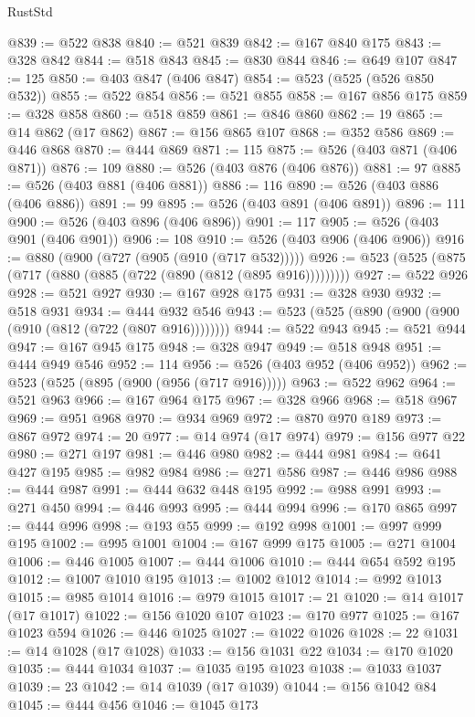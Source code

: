 \begin{lexlean}{RustStd}
\begin{coremodule}
{\begin{coremodule}
{{{{{{{{{{{{{{{{{{{{{{{{{{{{{{{{{{@839 := @522 @838
@840 := @521 @839
@842 := @167 @840 @175
@843 := @328 @842
@844 := @518 @843
@845 := @830 @844
@846 := @649 @107
@847 := 125
@850 := @403 @847 (@406 @847)
@854 := @523 (@525 (@526 @850 @532))
@855 := @522 @854
@856 := @521 @855
@858 := @167 @856 @175
@859 := @328 @858
@860 := @518 @859
@861 := @846 @860
@862 := 19
@865 := @14 @862 (@17 @862)
@867 := @156 @865 @107
@868 := @352 @586
@869 := @446 @868
@870 := @444 @869
@871 := 115
@875 := @526 (@403 @871 (@406 @871))
@876 := 109
@880 := @526 (@403 @876 (@406 @876))
@881 := 97
@885 := @526 (@403 @881 (@406 @881))
@886 := 116
@890 := @526 (@403 @886 (@406 @886))
@891 := 99
@895 := @526 (@403 @891 (@406 @891))
@896 := 111
@900 := @526 (@403 @896 (@406 @896))
@901 := 117
@905 := @526 (@403 @901 (@406 @901))
@906 := 108
@910 := @526 (@403 @906 (@406 @906))
@916 := @880 (@900 (@727 (@905 (@910 (@717 @532)))))
@926 := @523 (@525 (@875 (@717 (@880 (@885 (@722 (@890 (@812 (@895 @916)))))))))
@927 := @522 @926
@928 := @521 @927
@930 := @167 @928 @175
@931 := @328 @930
@932 := @518 @931
@934 := @444 @932 @546
@943 := @523 (@525 (@890 (@900 (@900 (@910 (@812 (@722 (@807 @916))))))))
@944 := @522 @943
@945 := @521 @944
@947 := @167 @945 @175
@948 := @328 @947
@949 := @518 @948
@951 := @444 @949 @546
@952 := 114
@956 := @526 (@403 @952 (@406 @952))
@962 := @523 (@525 (@895 (@900 (@956 (@717 @916)))))
@963 := @522 @962
@964 := @521 @963
@966 := @167 @964 @175
@967 := @328 @966
@968 := @518 @967
@969 := @951 @968
@970 := @934 @969
@972 := @870 @970 @189
@973 := @867 @972
@974 := 20
@977 := @14 @974 (@17 @974)
@979 := @156 @977 @22
@980 := @271 @197
@981 := @446 @980
@982 := @444 @981
@984 := @641 @427 @195
@985 := @982 @984
@986 := @271 @586
@987 := @446 @986
@988 := @444 @987
@991 := @444 @632 @448 @195
@992 := @988 @991
@993 := @271 @450
@994 := @446 @993
@995 := @444 @994
@996 := @170 @865
@997 := @444 @996
@998 := @193 @55
@999 := @192 @998
@1001 := @997 @999 @195
@1002 := @995 @1001
@1004 := @167 @999 @175
@1005 := @271 @1004
@1006 := @446 @1005
@1007 := @444 @1006
@1010 := @444 @654 @592 @195
@1012 := @1007 @1010 @195
@1013 := @1002 @1012
@1014 := @992 @1013
@1015 := @985 @1014
@1016 := @979 @1015
@1017 := 21
@1020 := @14 @1017 (@17 @1017)
@1022 := @156 @1020 @107
@1023 := @170 @977
@1025 := @167 @1023 @594
@1026 := @446 @1025
@1027 := @1022 @1026
@1028 := 22
@1031 := @14 @1028 (@17 @1028)
@1033 := @156 @1031 @22
@1034 := @170 @1020
@1035 := @444 @1034
@1037 := @1035 @195 @1023
@1038 := @1033 @1037
@1039 := 23
@1042 := @14 @1039 (@17 @1039)
@1044 := @156 @1042 @84
@1045 := @444 @456
@1046 := @1045 @173
}}}}}}}}}}}}}}}}}}}}}}}}}}}}}}}}}}
\end{coremodule}}
\end{coremodule}
\end{lexlean}
